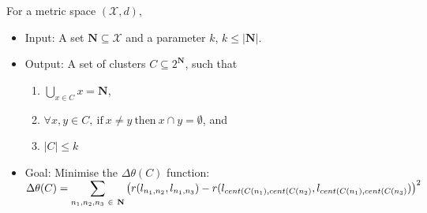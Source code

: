 For a metric space $(\mathcal{X}, d)$,
\begin{itemize}
    \item Input: A set $\textbf{N} \subseteq \mathcal{X}$ and a parameter $k$, $k \leq |\textbf{N}|$.
    \item Output: A set of clusters $C \subseteq 2^{\textbf{N}}$, such that
          \begin{enumerate}
              \item $\bigcup\limits_{x \in C}x = \textbf{N}$,
              \item $\forall x, y \in C, \ \text{if} \ x \neq y \ \text{then} \ x \cap y = \emptyset$, and
              \item $|C| \leq k$
          \end{enumerate}
    \item Goal: Minimise the $\Delta\theta(C)$ function:\smallbreak $\Delta\theta(C) = \mathlarger{\sum}\limits_{n_1, n_2, n_3 \ \in \ \textbf{N}} \left( r(l_{n_1,n_2}, l_{n_1,n_3}) - r(l_{cent(C(n_1),cent(C(n_2)}, l_{cent(C(n_1),cent(C(n_3)}) \right)^2$



\end{itemize}


